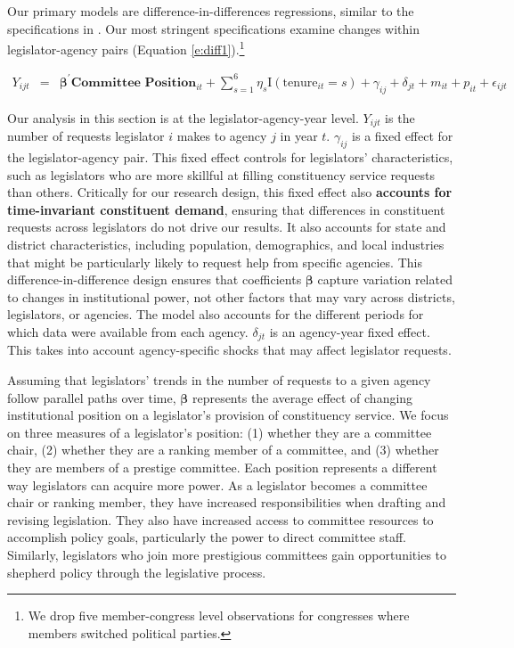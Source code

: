 \documentclass[12pt]{article}
\begin{document}
Our primary models are difference-in-differences regressions, similar to the specifications in \cite{BerryFowler2016}. Our most stringent specifications examine changes within legislator-agency pairs (Equation \ref{e:diff1}).\footnote{We drop five member-congress level observations for congresses where members switched political parties.} 

\begin{eqnarray}
Y_{ijt} & = & \boldsymbol{\beta}^{'} \textbf{Committee Position}_{it}  + \sum_{s = 1}^{6} \eta_{s} \text{I}\left(\text{tenure}_{it} = s\right) + \gamma_{ij} + \delta_{jt} + m_{it} + p_{it} + \epsilon_{ijt} \label{e:diff1}
\end{eqnarray}

Our analysis in this section is at the legislator-agency-year level. $Y_{ijt}$ is the number of requests legislator $i$ makes to agency $j$ in year $t$. $\gamma_{ij}$ is a fixed effect for the legislator-agency pair. This fixed effect controls for legislators' characteristics, such as legislators who are more skillful at filling constituency service requests than others. Critically for our research design, this fixed effect also \textbf{accounts for time-invariant constituent demand}, ensuring that differences in constituent requests across legislators do not drive our results. It also accounts for state and district characteristics, including population, demographics, and local industries that might be particularly likely to request help from specific agencies. This difference-in-difference design ensures that coefficients $\boldsymbol{\beta}$ capture variation related to changes in institutional power, not other factors that may vary across districts, legislators, or agencies. The model also accounts for the different periods for which data were available from each agency. $\delta_{jt}$ is an agency-year fixed effect. This takes into account agency-specific shocks that may affect legislator requests. 

Assuming that legislators' trends in the number of requests to a given agency follow parallel paths over time, $\boldsymbol{\beta}$ represents the average effect of changing institutional position on a legislator's provision of constituency service. We focus on three measures of a legislator's position: (1) whether they are a committee chair, (2) whether they are a ranking member of a committee, and (3) whether they are members of a prestige committee. Each position represents a different way legislators can acquire more power. As a legislator becomes a committee chair or ranking member, they have increased responsibilities when drafting and revising legislation. They also have increased access to committee resources to accomplish policy goals, particularly the power to direct committee staff. Similarly, legislators who join more prestigious committees gain opportunities to shepherd policy through the legislative process.
\end{document}
